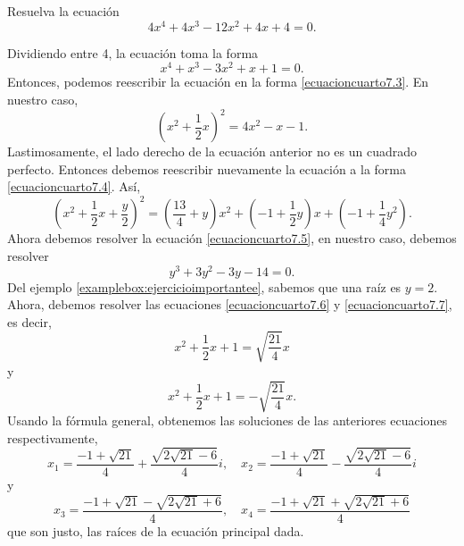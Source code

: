 \begin{examplebox}{}{}
    Resuelva la ecuación
    $$4x^4 + 4x^3 - 12x^2 + 4x + 4 = 0.$$

    \tcblower
    \solucion Dividiendo entre 4, la ecuación toma la forma
    $$x^4 + x^3 - 3x^2 + x + 1 = 0.$$
    Entonces, podemos reescribir la ecuación en la forma \eqref{ecuacioncuarto7.3}. En nuestro caso,
    $$\left( x^2 + \frac{1}{2}x \right)^2 = 4x^2 - x - 1.$$
    Lastimosamente, el lado derecho de la ecuación anterior no es un cuadrado perfecto. Entonces debemos reescribir nuevamente la ecuación a la forma \eqref{ecuacioncuarto7.4}. Así,
    $$\left( x^2 + \frac{1}{2}x + \frac{y}{2} \right)^2 = \left(\frac{13}{4} + y\right)x^2 + \left( -1 + \frac{1}{2}y \right)x + \left( - 1 + \frac{1}{4} y^2 \right).$$
    Ahora debemos resolver la ecuación \eqref{ecuacioncuarto7.5}, en nuestro caso, debemos resolver
    $$y^3 + 3y^2 - 3y - 14 = 0.$$
    Del ejemplo \ref{examplebox:ejercicioimportantee}, sabemos que una raíz es $y = 2$. Ahora, debemos resolver las ecuaciones \eqref{ecuacioncuarto7.6} y \eqref{ecuacioncuarto7.7}, es decir,
    $$x^2 + \frac{1}{2}x + 1 = \sqrt{\frac{21}{4}}x$$
    y
    $$x^2 + \frac{1}{2}x + 1 = - \sqrt{\frac{21}{4}}x.$$
    Usando la fórmula general, obtenemos las soluciones de las anteriores ecuaciones respectivamente,
    $$x_1 = \frac{-1 + \sqrt{21}}{4} + \frac{\sqrt{2\sqrt{21} - 6}}{4}i, \quad x_2 = \frac{-1 + \sqrt{21}}{4} - \frac{\sqrt{2\sqrt{21} - 6}}{4}i$$
    y
    $$x_3 = \frac{-1 + \sqrt{21} - \sqrt{2\sqrt{21} + 6}}{4}, \quad x_4 = \frac{-1 + \sqrt{21} + \sqrt{2\sqrt{21} + 6}}{4}$$
    que son justo, las raíces de la ecuación principal dada.
\end{examplebox}

\newpage

